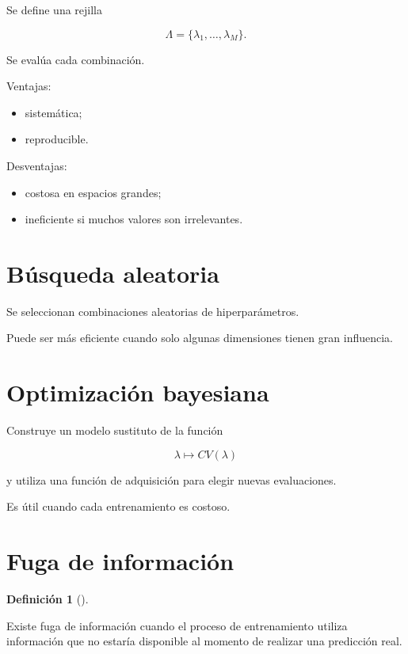 \documentclass[
  spanish,
  11pt,
  letterpaper,
  DIV=11,
  numbers=noendperiod]{scrreprt}
\providecommand{\tightlist}{%
  \setlength{\itemsep}{0pt}\setlength{\parskip}{0pt}}
\theoremstyle{definition}
\newtheorem{definition}{Definición}[chapter]
\theoremstyle{plain}
\theoremstyle{definition}
\theoremstyle{remark}
\begin{document}
Se define una rejilla

\[
\Lambda
=
\{
\lambda_1,\ldots,\lambda_M
\}.
\]

Se evalúa cada combinación.

Ventajas:

\begin{itemize}
\tightlist
\item
  sistemática;
\item
  reproducible.
\end{itemize}

Desventajas:

\begin{itemize}
\tightlist
\item
  costosa en espacios grandes;
\item
  ineficiente si muchos valores son irrelevantes.
\end{itemize}

\section{Búsqueda aleatoria}\label{buxfasqueda-aleatoria}

Se seleccionan combinaciones aleatorias de hiperparámetros.

Puede ser más eficiente cuando solo algunas dimensiones tienen gran
influencia.

\section{Optimización bayesiana}\label{optimizaciuxf3n-bayesiana}

Construye un modelo sustituto de la función

\[
\lambda
\mapsto
CV(\lambda)
\]

y utiliza una función de adquisición para elegir nuevas evaluaciones.

Es útil cuando cada entrenamiento es costoso.

\section{Fuga de información}\label{fuga-de-informaciuxf3n}

\begin{definition}[]\protect\hypertarget{def-fuga-informacion}{}\label{def-fuga-informacion}

Existe fuga de información cuando el proceso de entrenamiento utiliza
información que no estaría disponible al momento de realizar una
predicción real.

\end{definition}
\end{document}
